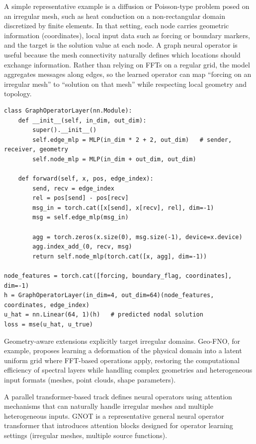 \documentclass[11pt]{article}
\begin{document}
A simple representative example is a diffusion or Poisson-type problem posed on an irregular mesh, such as heat conduction on a non-rectangular domain discretized by finite elements. In that setting, each node carries geometric information (coordinates), local input data such as forcing or boundary markers, and the target is the solution value at each node. A graph neural operator is useful because the mesh connectivity naturally defines which locations should exchange information. Rather than relying on FFTs on a regular grid, the model aggregates messages along edges, so the learned operator can map ``forcing on an irregular mesh'' to ``solution on that mesh'' while respecting local geometry and topology.

\begin{lstlisting}[style=scimlpython,caption={Representative graph neural operator sketch on an irregular mesh.},label={lst:gno}]
class GraphOperatorLayer(nn.Module):
    def __init__(self, in_dim, out_dim):
        super().__init__()
        self.edge_mlp = MLP(in_dim * 2 + 2, out_dim)   # sender, receiver, geometry
        self.node_mlp = MLP(in_dim + out_dim, out_dim)

    def forward(self, x, pos, edge_index):
        send, recv = edge_index
        rel = pos[send] - pos[recv]
        msg_in = torch.cat([x[send], x[recv], rel], dim=-1)
        msg = self.edge_mlp(msg_in)

        agg = torch.zeros(x.size(0), msg.size(-1), device=x.device)
        agg.index_add_(0, recv, msg)
        return self.node_mlp(torch.cat([x, agg], dim=-1))

node_features = torch.cat([forcing, boundary_flag, coordinates], dim=-1)
h = GraphOperatorLayer(in_dim=4, out_dim=64)(node_features, coordinates, edge_index)
u_hat = nn.Linear(64, 1)(h)   # predicted nodal solution
loss = mse(u_hat, u_true)
\end{lstlisting}

Geometry-aware extensions explicitly target irregular domains. Geo-FNO, for example, proposes learning a deformation of the physical domain into a latent uniform grid where FFT-based operations apply, restoring the computational efficiency of spectral layers while handling complex geometries and heterogeneous input formats (meshes, point clouds, shape parameters).

A parallel transformer-based track defines neural operators using attention mechanisms that can naturally handle irregular meshes and multiple heterogeneous inputs. GNOT is a representative general neural operator transformer that introduces attention blocks designed for operator learning settings (irregular meshes, multiple source functions).
\end{document}
